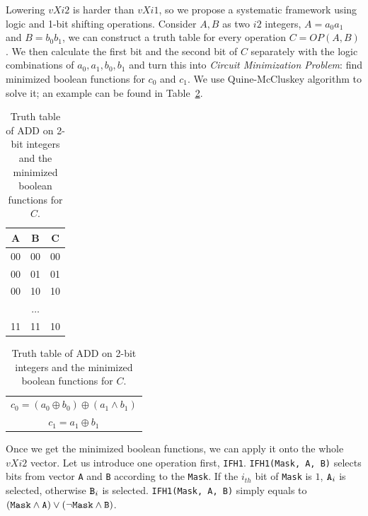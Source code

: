 Lowering $vXi2$ is harder than $vXi1$, so we propose a systematic framework using logic and 1-bit shifting operations. Consider $A, B$ as two $i2$ integers, $A=a_0a_1$ and $B=b_0b_1$, we can construct a truth table for every operation $C = OP(A, B)$. We then calculate the first bit and the second bit of $C$ separately with the logic combinations of $a_0, a_1, b_0, b_1$ and turn this into \textit{Circuit Minimization Problem}: find minimized boolean functions for $c_0$ and $c_1$. We use Quine-McCluskey algorithm\cite{johnson1981quine} to solve it; an example can be found in Table~\ref{table:quine}.

\begin{table}[h]
  \centering
  \begin{tabular}{ccc}
    \hline
    A                   & B                   & C                  \\ \hline
    00                  & 00                  & 00                 \\
    00                  & 01                  & 01                 \\
    00                  & 10                  & 10                 \\
    \multicolumn{3}{c}{$\ldots$}                                        \\
    11                  & 11                  & 10                 \\ \hline
  \end{tabular}

  \begin{tabular}{lll}
    \\
    \multicolumn{3}{c}{$c_0 = (a_0 \oplus b_0) \oplus (a_1 \land b_1)$} \\
    \multicolumn{3}{c}{$c_1 = a_1 \oplus b_1$}
  \end{tabular}
  \caption{Truth table of ADD on 2-bit integers and the minimized boolean functions for $C$.}
  \label{table:quine}
\end{table}

Once we get the minimized boolean functions, we can apply it onto the whole $vXi2$ vector. Let us introduce one operation first, {\tt IFH1}. {\tt IFH1(Mask, A, B)} selects bits from vector {\tt A} and {\tt B} according to the {\tt Mask}. If the $i_{th}$ bit of {\tt Mask} is $1$, $\text{\tt A}_i$ is selected, otherwise $\text{\tt B}_i$ is selected. {\tt IFH1(Mask, A, B)} simply equals to $(\text{\tt Mask} \land \text{\tt A}) \lor (\lnot \text{\tt Mask} \land \text{\tt B})$.

